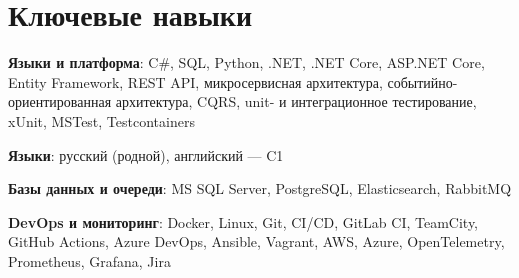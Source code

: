 \documentclass[letterpaper,11pt]{article}
\begin{document}
%
\section{Ключевые навыки}
\resumeSubHeadingListStart
\item{
            \textbf{Языки и платформа}{: C\#, SQL, Python, .NET, .NET Core, ASP.NET Core, Entity Framework, REST API, микросервисная архитектура, событийно-ориентированная архитектура, CQRS, unit- и интеграционное тестирование, xUnit, MSTest, Testcontainers}
      }
\item{
            \textbf{Языки}{: русский (родной), английский --- C1}
      }
\item{
            \textbf{Базы данных и очереди}{: MS SQL Server, PostgreSQL, Elasticsearch, RabbitMQ}
      }
\item{
            \textbf{DevOps и мониторинг}{: Docker, Linux, Git, CI/CD, GitLab CI, TeamCity, GitHub Actions, Azure DevOps, Ansible, Vagrant, AWS, Azure, OpenTelemetry, Prometheus, Grafana, Jira}
      }
\resumeSubHeadingListEnd


\end{document}
